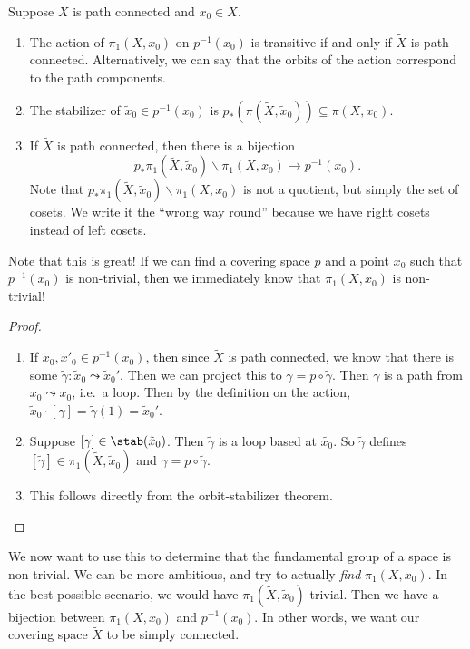 \documentclass[a4paper]{article}
\begin{document}
\begin{lemma}
  Suppose $X$ is path connected and $x_0 \in X$.
  \begin{enumerate}
    \item The action of $\pi_1(X, x_0)$ on $p^{-1}(x_0)$ is transitive if and only if $\tilde{X}$ is path connected. Alternatively, we can say that the orbits of the action correspond to the path components.
    \item The stabilizer of $\tilde{x}_0 \in p^{-1}(x_0)$ is $p_*(\pi(\tilde{X}, \tilde{x}_0)) \subseteq \pi(X, x_0)$.
    \item If $\tilde{X}$ is path connected, then there is a bijection
      \[
        p_* \pi_1(\tilde{X}, \tilde{x}_0)\backslash \pi_1(X, x_0) \to p^{-1}(x_0).
      \]
      Note that $p_* \pi_1(\tilde{X}, \tilde{x}_0)\backslash \pi_1(X, x_0)$ is not a quotient, but simply the set of cosets. We write it the ``wrong way round'' because we have right cosets instead of left cosets.
  \end{enumerate}
\end{lemma}
Note that this is great! If we can find a covering space $p$ and a point $x_0$ such that $p^{-1}(x_0)$ is non-trivial, then we immediately know that $\pi_1(X, x_0)$ is non-trivial!

\begin{proof}\leavevmode
  \begin{enumerate}
    \item If $\tilde{x}_0, \tilde{x}'_0 \in p^{-1}(x_0)$, then since $\tilde{X}$ is path connected, we know that there is some $\tilde{\gamma}: \tilde{x}_0 \leadsto \tilde{x}_0'$. Then we can project this to $\gamma = p\circ \tilde{\gamma}$. Then $\gamma$ is a path from $x_0 \leadsto x_0$, i.e.\ a loop. Then by the definition on the action, $\tilde{x}_0 \cdot [\gamma] = \tilde{\gamma}(1) = \tilde{x}_0'$.

    \item Suppose $[\gamma] \in \stab(\tilde{x}_0)$. Then $\tilde{\gamma}$ is a loop based at $\tilde{x_0}$. So $\tilde{\gamma}$ defines $[\tilde{\gamma}] \in \pi_1(\tilde{X}, \tilde{x}_0)$ and $\gamma = p\circ \tilde{\gamma}$.

    \item This follows directly from the orbit-stabilizer theorem.
  \end{enumerate}
\end{proof}

We now want to use this to determine that the fundamental group of a space is non-trivial. We can be more ambitious, and try to actually \emph{find} $\pi_1(X, x_0)$. In the best possible scenario, we would have $\pi_1(\tilde{X}, \tilde{x}_0)$ trivial. Then we have a bijection between $\pi_1(X, x_0)$ and $p^{-1}(x_0)$. In other words, we want our covering space $\tilde{X}$ to be simply connected.
\end{document}
